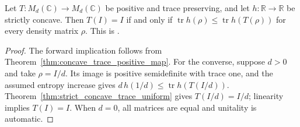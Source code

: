 \begin{theorem}
    \label{thm:entropy_increasing_maps}
    \leanok
    Let $T:M_d(\mathbb C)\to M_d(\mathbb C)$ be positive and trace
    preserving, and let $h:\mathbb R\to\mathbb R$ be strictly concave.
    Then $T(I)=I$ if and only if
    $\operatorname{tr}h(\rho)\le\operatorname{tr}h(T(\rho))$
    for every density matrix $\rho$.
    This is \cite[Equation~(8.22), Corollary ``Entropy increasing maps'']{Wolf2012Quantum}.
\end{theorem}
\begin{proof}\leanok
    The forward implication follows from
    Theorem~\ref{thm:concave_trace_positive_map}.
    For the converse, suppose $d>0$ and take $\rho=I/d$.
    Its image is positive semidefinite with trace one, and the assumed
    entropy increase gives
    $d\,h(1/d)\le\operatorname{tr}h(T(I/d))$.
    Theorem~\ref{thm:strict_concave_trace_uniform} gives $T(I/d)=I/d$;
    linearity implies $T(I)=I$.
    When $d=0$, all matrices are equal and unitality is automatic.
\end{proof}
\endinput

\begin{theorem}[Measurements and convex functions]
    \label{thm:measurement_convexity}
    \lean{Matrix.sum_convex_measurement_le}
    \leanok
    Let $\{P_i\}_{i=1}^m$ be a POVM on $M_d(\mathbb C)$ with $m\geq d$ and
    $\operatorname{tr}P_i=d/m$, let $\rho\geq0$, and put
    $p_i=\operatorname{tr}(P_i\rho)$. For every convex $f:\R\to\R$ with
    $f(0)\leq0$,
    \begin{align*}
        \operatorname{tr}f(\rho)\geq\sum_{i=1}^mf(p_i),
    \end{align*}
    and for $m=d$ the condition $f(0)\le0$ is not needed. This is
    \cite[Theorem~8.9, Equation~(8.23)]{Wolf2012Quantum}.
\end{theorem}
\begin{proof}\leanok
    In an eigenbasis $(v_k)$ of $\rho$ with eigenvalues $\lambda_k$, put
    $a_{ik}=\langle v_k,P_iv_k\rangle\geq0$. Then $p_i=\sum_ka_{ik}\lambda_k$,
    $\sum_ia_{ik}=1$ and $\sum_ka_{ik}=\operatorname{tr}P_i=d/m\leq1$.
    Jensen's inequality with the remaining weight $1-d/m$ on $0$ gives
    $f(p_i)\leq\sum_ka_{ik}f(\lambda_k)+(1-d/m)f(0)$. Summing over $i$ yields
    $\sum_if(p_i)\leq\sum_kf(\lambda_k)+(m-d)f(0)\leq\operatorname{tr}f(\rho)$.
\end{proof}


